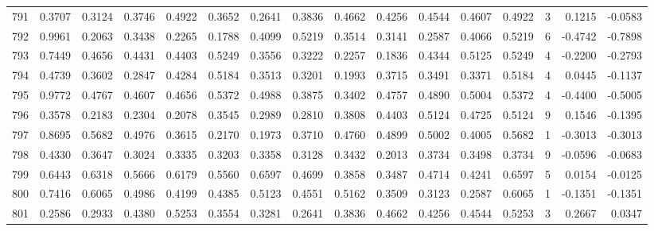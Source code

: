 \begin{tabular}{lrrrrrrrrrrrrrrr}
791 &      0.3707 &  0.3124 &  0.3746 &  0.4922 &  0.3652 &  0.2641 &  0.3836 &  0.4662 &  0.4256 &  0.4544 &   0.4607 &     0.4922 &      3 &                    0.1215 &                    -0.0583 \\
792 &      0.9961 &  0.2063 &  0.3438 &  0.2265 &  0.1788 &  0.4099 &  0.5219 &  0.3514 &  0.3141 &  0.2587 &   0.4066 &     0.5219 &      6 &                   -0.4742 &                    -0.7898 \\
793 &      0.7449 &  0.4656 &  0.4431 &  0.4403 &  0.5249 &  0.3556 &  0.3222 &  0.2257 &  0.1836 &  0.4344 &   0.5125 &     0.5249 &      4 &                   -0.2200 &                    -0.2793 \\
794 &      0.4739 &  0.3602 &  0.2847 &  0.4284 &  0.5184 &  0.3513 &  0.3201 &  0.1993 &  0.3715 &  0.3491 &   0.3371 &     0.5184 &      4 &                    0.0445 &                    -0.1137 \\
795 &      0.9772 &  0.4767 &  0.4607 &  0.4656 &  0.5372 &  0.4988 &  0.3875 &  0.3402 &  0.4757 &  0.4890 &   0.5004 &     0.5372 &      4 &                   -0.4400 &                    -0.5005 \\
796 &      0.3578 &  0.2183 &  0.2304 &  0.2078 &  0.3545 &  0.2989 &  0.2810 &  0.3808 &  0.4403 &  0.5124 &   0.4725 &     0.5124 &      9 &                    0.1546 &                    -0.1395 \\
797 &      0.8695 &  0.5682 &  0.4976 &  0.3615 &  0.2170 &  0.1973 &  0.3710 &  0.4760 &  0.4899 &  0.5002 &   0.4005 &     0.5682 &      1 &                   -0.3013 &                    -0.3013 \\
798 &      0.4330 &  0.3647 &  0.3024 &  0.3335 &  0.3203 &  0.3358 &  0.3128 &  0.3432 &  0.2013 &  0.3734 &   0.3498 &     0.3734 &      9 &                   -0.0596 &                    -0.0683 \\
799 &      0.6443 &  0.6318 &  0.5666 &  0.6179 &  0.5560 &  0.6597 &  0.4699 &  0.3858 &  0.3487 &  0.4714 &   0.4241 &     0.6597 &      5 &                    0.0154 &                    -0.0125 \\
800 &      0.7416 &  0.6065 &  0.4986 &  0.4199 &  0.4385 &  0.5123 &  0.4551 &  0.5162 &  0.3509 &  0.3123 &   0.2587 &     0.6065 &      1 &                   -0.1351 &                    -0.1351 \\
801 &      0.2586 &  0.2933 &  0.4380 &  0.5253 &  0.3554 &  0.3281 &  0.2641 &  0.3836 &  0.4662 &  0.4256 &   0.4544 &     0.5253 &      3 &                    0.2667 &                     0.0347 \\

\end{tabular}
